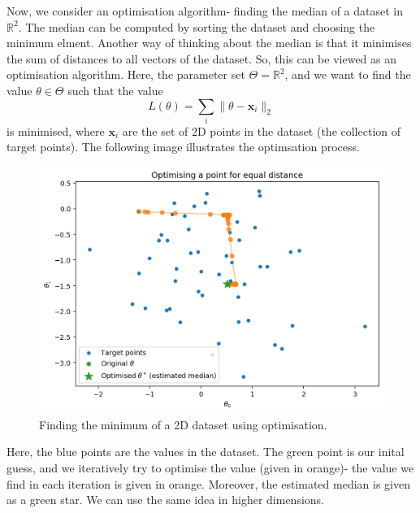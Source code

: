 \documentclass[a4paper, openany]{memoir}
\begin{document}
Now, we consider an optimisation algorithm- finding the median of a dataset in $\mathbb{R}^2$. The median can be computed by sorting the dataset and choosing the minimum elment. Another way of thinking about the median is that it minimises the sum of distances to all vectors of the dataset. So, this can be viewed as an optimisation algorithm. Here, the parameter set $\Theta = \mathbb{R}^2$, and we want to find the value $\theta \in \Theta$ such that the value
\[L(\theta) = \sum_i \lVert \theta - \mathbf{x}_i \rVert_2\]
is minimised, where $\mathbf{x}_i$ are the set of 2D points in the dataset (the collection of target points). The following image illustrates the optimsation process.
\begin{figure}[H]
    \centering
    \includegraphics[scale=0.6]{src/4.2 optimising a point to equal distance.png}
    \caption{Finding the minimum of a 2D dataset using optimisation.}
\end{figure}
\noindent Here, the blue points are the values in the dataset. The green point is our inital guess, and we iteratively try to optimise the value (given in orange)- the value we find in each iteration is given in orange. Moreover, the estimated median is given as a green star. We can use the same idea in higher dimensions.
\end{document}
